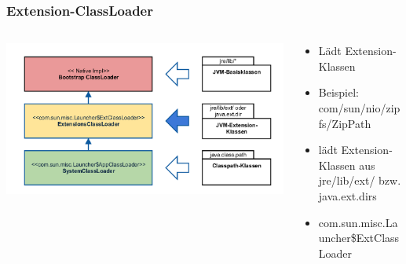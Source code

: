 \documentclass[aspectratio=169]{beamer}
\begin{document}
\begin{frame}
	\frametitle{Extension-ClassLoader}
	\begin{columns}[T] 
	\begin{column}{.46\textwidth}
		\includegraphics[scale=0.06]{assets/classloader-hierachie-extension-active.png} 
	\end{column}
	\hfill
	\begin{column}{.56\textwidth}

	\begin{itemize}
		\item{Lädt Extension-Klassen}
		\item{Beispiel: com/sun/nio/zipfs/ZipPath}
		\item{lädt Extension-Klassen aus jre/lib/ext/ bzw. java.ext.dirs}
		\item{com.sun.misc.Launcher\$ExtClassLoader}
	\end{itemize}
	\end{column}
	\end{columns}
\end{frame}
\end{document}
